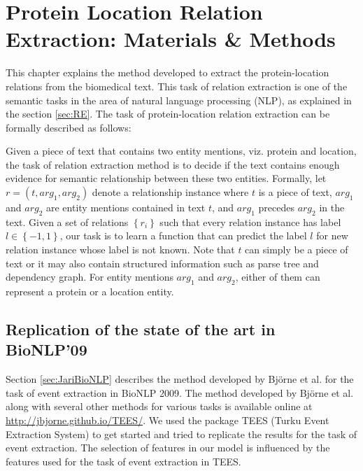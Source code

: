 \chapter{Protein Location Relation Extraction: Materials \& Methods}\label{chapter:methods}
\newcommand*{\xml}[1]{\texttt{<#1>}}

This chapter explains the method developed to extract the protein-location relations from the biomedical text. This task of relation extraction is one of the semantic tasks in the area of natural language processing (NLP), as explained in the section \ref{sec:RE}. The task of protein-location relation extraction can be formally described as follows:

Given a piece of text that contains two entity mentions, viz. protein and location, the task of relation extraction method is to decide if the text contains enough evidence for semantic relationship between these two entities. Formally, let $r=(t,arg_1,arg_2)$ denote a relationship instance where $t$ is a piece of text, $arg_1$ and $arg_2$  are entity mentions contained in text $t$, and $arg_1$ precedes $arg_2$ in the text. Given a set of relations $\left\lbrace r_i \right\rbrace$ such that every relation instance has label $l \in \left\lbrace-1,1\right\rbrace$, our task is to learn a function that can predict the label $l$ for new relation instance whose label is not known. Note that $t$ can simply be a piece of text or it may also contain structured information such as parse tree and dependency graph. For entity mentions $arg_1$ and $arg_2$, either of them can represent a protein or a location entity.
 
\section{Replication of the state of the art in BioNLP'09}

Section \ref{sec:JariBioNLP} describes the method developed by Björne et al. \cite{bjorne2009extracting} for the task of event extraction in BioNLP 2009. The method developed by Björne et al. along with several other methods for various tasks is available online at \url{http://jbjorne.github.io/TEES/}. We used the package TEES (Turku Event Extraction System) \cite{teesonline} to get started and tried to replicate the results for the task of event extraction. The selection of features in our model is influenced by the features used for the task of event extraction in TEES.

